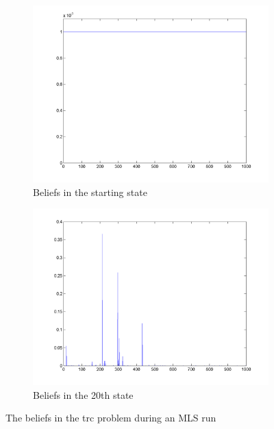 \documentclass[10pt,a4paper]{article}
\begin{document}
\begin{figure}
        \centering
        \begin{subfigure}{0.48\textwidth}
        		\includegraphics[width=\textwidth]{Paths/trc/plot-MLS-bel-1-8790226525.png}
                \caption{Beliefs in the starting state}
                \label{fig:bel_MLS_trc_part1}
                \hspace{10pt}
        \end{subfigure}
        \quad
        \begin{subfigure}{0.48\textwidth}
        		\includegraphics[width=\textwidth]{Paths/trc/plot-MLS-bel-2-8790226525.png}
                \caption{Beliefs in the 20th state}
                \label{fig:bel_MLS_trc_part2}
                \hspace{-10pt}
        \end{subfigure}
        \caption{The beliefs in the trc problem during an MLS run}
        \label{fig:bel_trc_MLS}
\end{figure}
\end{document}
